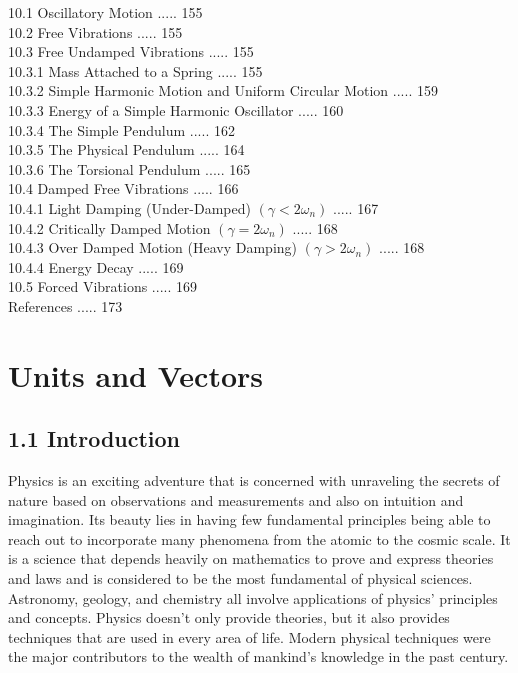 \documentclass[10pt]{article}
\begin{document}
10.1 Oscillatory Motion ..... 155\\
10.2 Free Vibrations ..... 155\\
10.3 Free Undamped Vibrations ..... 155\\
10.3.1 Mass Attached to a Spring ..... 155\\
10.3.2 Simple Harmonic Motion and Uniform Circular Motion ..... 159\\
10.3.3 Energy of a Simple Harmonic Oscillator ..... 160\\
10.3.4 The Simple Pendulum ..... 162\\
10.3.5 The Physical Pendulum ..... 164\\
10.3.6 The Torsional Pendulum ..... 165\\
10.4 Damped Free Vibrations ..... 166\\
10.4.1 Light Damping (Under-Damped) $\left(\gamma<2 \omega_{n}\right)$ ..... 167\\
10.4.2 Critically Damped Motion $\left(\gamma=2 \omega_{n}\right)$ ..... 168\\
10.4.3 Over Damped Motion (Heavy Damping) $\left(\gamma>2 \omega_{n}\right)$ ..... 168\\
10.4.4 Energy Decay ..... 169\\
10.5 Forced Vibrations ..... 169\\
References ..... 173

\section*{Units and Vectors}
\subsection*{1.1 Introduction}
Physics is an exciting adventure that is concerned with unraveling the secrets of nature based on observations and measurements and also on intuition and imagination. Its beauty lies in having few fundamental principles being able to reach out to incorporate many phenomena from the atomic to the cosmic scale. It is a science that depends heavily on mathematics to prove and express theories and laws and is considered to be the most fundamental of physical sciences. Astronomy, geology, and chemistry all involve applications of physics' principles and concepts. Physics doesn't only provide theories, but it also provides techniques that are used in every area of life. Modern physical techniques were the major contributors to the wealth of mankind's knowledge in the past century.
\end{document}
